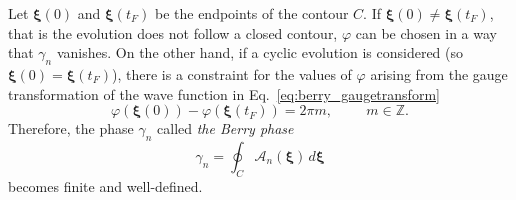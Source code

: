 Let $ \mathbold{\xi} (0) $ and $  \mathbold{\xi} (t_F)$ be the endpoints of the contour $C$. If $ \mathbold{\xi} (0) \neq \mathbold{\xi} (t_F)$, that is the evolution does not follow a closed contour, $\varphi$ can be chosen in a way that $\gamma_n$ vanishes. On the other hand, if a cyclic evolution is considered (so $ \mathbold{\xi} (0) = \mathbold{\xi} (t_F)$), there is a constraint for the values of $\varphi$ arising from the gauge transformation of the wave function in Eq.~\eqref{eq:berry_gaugetransform}
\begin{equation}
\varphi ( \mathbold{\xi} (0)) - \varphi ( \mathbold{\xi}  (t_F) ) = 2 \pi m, \hspace{1cm} m \in \mathbb{Z}.
\end{equation}
Therefore, the phase $\gamma_n$ called \emph{the Berry phase} 
\begin{equation}
\gamma_n = \oint_C \bm{\mathcal{A}}_n (\mathbold{\xi}) \, d \mathbold{\xi}
\label{eq:berry_phase_final}
\end{equation}
becomes finite and well-defined. 

